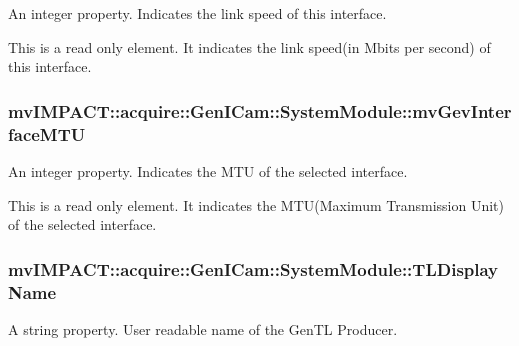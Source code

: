 An integer property. Indicates the link speed of this interface. 

This is a read only element. It indicates the link speed(in Mbits per second) of this interface. \hypertarget{classmv_i_m_p_a_c_t_1_1acquire_1_1_gen_i_cam_1_1_system_module_abf1647cef98a641c128e2b93973b88b9}{
\subsubsection[{mv\+Gev\+Interface\+M\+T\+U}]{ mv\+I\+M\+P\+A\+C\+T\+::acquire\+::\+Gen\+I\+Cam\+::\+System\+Module\+::mv\+Gev\+Interface\+M\+T\+U}}\label{classmv_i_m_p_a_c_t_1_1acquire_1_1_gen_i_cam_1_1_system_module_abf1647cef98a641c128e2b93973b88b9}


An integer property. Indicates the M\+T\+U of the selected interface. 

This is a read only element. It indicates the M\+T\+U(\+Maximum Transmission Unit) of the selected interface. \hypertarget{classmv_i_m_p_a_c_t_1_1acquire_1_1_gen_i_cam_1_1_system_module_ab5c343774dcbce2bf1b54dd14138ed95}{
\subsubsection[{T\+L\+Display\+Name}]{ mv\+I\+M\+P\+A\+C\+T\+::acquire\+::\+Gen\+I\+Cam\+::\+System\+Module\+::\+T\+L\+Display\+Name}}\label{classmv_i_m_p_a_c_t_1_1acquire_1_1_gen_i_cam_1_1_system_module_ab5c343774dcbce2bf1b54dd14138ed95}


A string property. User readable name of the Gen\+T\+L Producer. 

